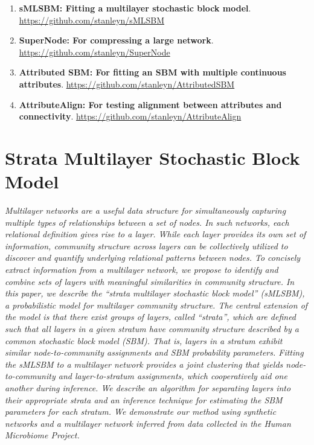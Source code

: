  \begin{enumerate}
 \item {\bf sMLSBM: Fitting a multilayer stochastic block model}. \url{https://github.com/stanleyn/sMLSBM}
 \item {\bf SuperNode: For compressing a large network}. \url{https://github.com/stanleyn/SuperNode}
 \item {\bf Attributed SBM: For fitting an SBM with multiple continuous attributes}. \url{https://github.com/stanleyn/AttributedSBM}
 \item{\bf AttributeAlign: For testing alignment between attributes and connectivity}. \url{https://github.com/stanleyn/AttributeAlign}
 \end{enumerate}
 



\chapter{Strata Multilayer Stochastic Block Model}
\noindent{}


\emph{Multilayer networks are a useful data structure for simultaneously capturing multiple types of relationships between a set of nodes. In such networks, each relational definition gives rise to a layer. While each layer provides its own set of information, community structure across layers can be collectively utilized to discover and quantify underlying relational patterns between nodes. To concisely extract information from a multilayer network, we propose to identify and combine sets of layers with meaningful similarities in community structure. In this paper, we describe the ``strata multilayer stochastic block model'' (sMLSBM), a probabilistic model for multilayer community structure. The central extension of the model is that there exist groups of layers, called ``strata'', which are defined such that all layers in a given stratum have community structure described by a common stochastic block model (SBM). That is, layers in a stratum exhibit similar node-to-community assignments and SBM probability parameters. Fitting the sMLSBM to a multilayer network provides a joint clustering that yields node-to-community and layer-to-stratum assignments, which cooperatively aid one another during inference. We describe an algorithm for separating layers into their appropriate strata and an inference technique for estimating the SBM parameters for each stratum. We demonstrate our method using synthetic networks and a multilayer network inferred from data collected in the Human Microbiome Project.  
}
